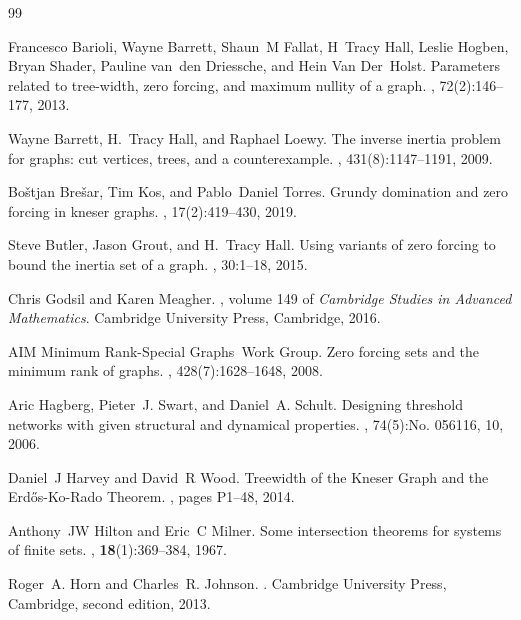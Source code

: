 \documentclass[3p,times,12pt]{article}
\begin{document}
\begin{thebibliography}{99}	

Francesco Barioli, Wayne Barrett, Shaun~M Fallat, H~Tracy Hall, Leslie Hogben,
  Bryan Shader, Pauline van~den Driessche, and Hein Van Der~Holst.
\newblock Parameters related to tree-width, zero forcing, and maximum nullity
  of a graph.
, 72(2):146--177, 2013.

Wayne Barrett, H.~Tracy Hall, and Raphael Loewy.
\newblock The inverse inertia problem for graphs: cut vertices, trees, and a
  counterexample.
, 431(8):1147--1191, 2009.

Bo{\v{s}}tjan Bre{\v{s}}ar, Tim Kos, and Pablo~Daniel Torres.
\newblock Grundy domination and zero forcing in kneser graphs.
, 17(2):419--430, 2019.

Steve Butler, Jason Grout, and H.~Tracy Hall.
\newblock Using variants of zero forcing to bound the inertia set of a graph.
, 30:1--18, 2015.

Chris Godsil and Karen Meagher.
, volume
  149 of {\em Cambridge Studies in Advanced Mathematics}.
\newblock Cambridge University Press, Cambridge, 2016.

AIM Minimum Rank-Special Graphs~Work Group.
\newblock Zero forcing sets and the minimum rank of graphs.
, 428(7):1628--1648, 2008.

Aric Hagberg, Pieter~J. Swart, and Daniel~A. Schult.
\newblock Designing threshold networks with given structural and dynamical
  properties.
, 74(5):No. 056116, 10, 2006.

Daniel~J Harvey and David~R Wood.
\newblock Treewidth of the {K}neser {G}raph and the {E}rd{\H{o}}s-{K}o-{R}ado
  {T}heorem.
, pages P1--48, 2014.

Anthony~JW Hilton and Eric~C Milner.
\newblock Some intersection theorems for systems of finite sets.
, {\bf 18}(1):369--384,
  1967.

Roger~A. Horn and Charles~R. Johnson.
.
\newblock Cambridge University Press, Cambridge, second edition, 2013.


\end{thebibliography}
\end{document}
